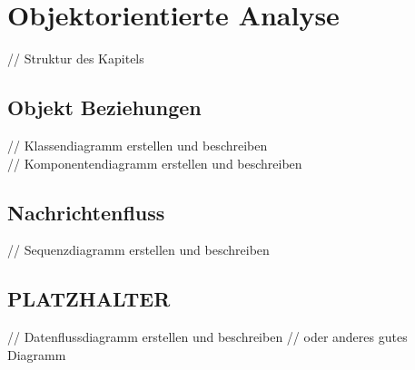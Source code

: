 \section{Objektorientierte Analyse}\label{analyse}
// Struktur des Kapitels

\subsection{Objekt Beziehungen}
// Klassendiagramm erstellen und beschreiben\\
// Komponentendiagramm erstellen und beschreiben

\subsection{Nachrichtenfluss}
// Sequenzdiagramm erstellen und beschreiben

\subsection{PLATZHALTER}
// Datenflussdiagramm erstellen und beschreiben
// oder anderes gutes Diagramm
